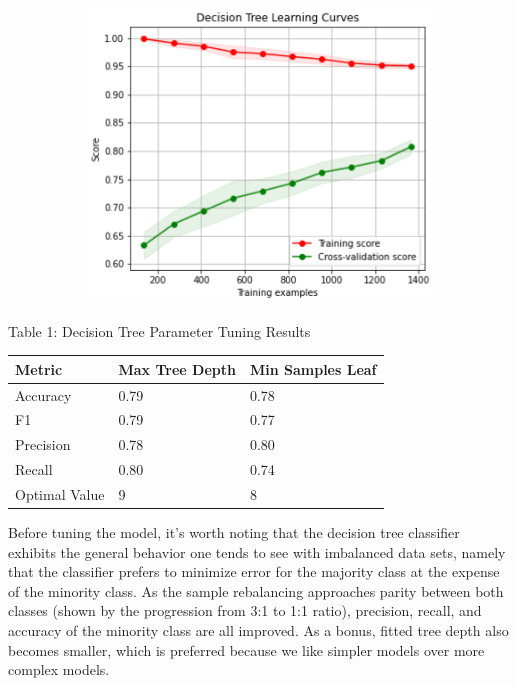 \documentclass{article}
\begin{document}
\begin{figure}
\begin{subfigure}{.38\textwidth}
	\end{subfigure}%
	\begin{subfigure}{.38\textwidth}
		\centering
		\includegraphics[width=\linewidth]{poland_decision_learning_curve_with_max_depth.png}
		
	\end{subfigure}
	\label{fig:test}
\end{figure}

\begin{center}
	Table 1: Decision Tree Parameter Tuning Results\\
	\begin{tabular}{ l l l }
		\hline
		Metric & Max Tree Depth & Min Samples Leaf \\
		\hline
		Accuracy & 0.79 & 0.78\\
		F1 & 0.79 & 0.77 \\
		Precision & 0.78 & 0.80 \\
		Recall & 0.80 & 0.74  \\
		Optimal Value & 9 & 8\\
		\hline 
		
		
	\end{tabular}
\end{center}

Before tuning the model, it's worth noting that the decision tree classifier exhibits the general behavior one tends to see with imbalanced data sets, namely that the classifier prefers to minimize error for the majority class at the expense of the minority class. As the sample rebalancing approaches parity between both classes (shown by the progression from 3:1 to 1:1 ratio), precision, recall, and accuracy of the minority class are all improved. As a bonus, fitted tree depth also becomes smaller, which is preferred because we like simpler models over more complex models. \newline
\end{document}
